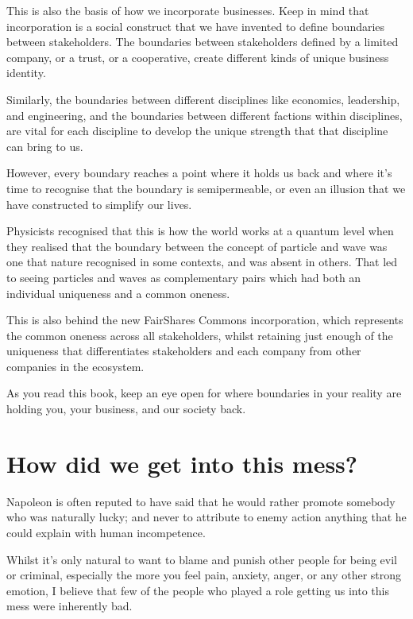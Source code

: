 This is also the basis of how we incorporate businesses. Keep in mind that incorporation is a social construct that we have invented to define boundaries between stakeholders. The boundaries between stakeholders defined by a limited company, or a trust, or a cooperative, create different kinds of unique business identity.


Similarly, the boundaries between different disciplines like economics, leadership, and engineering, and the boundaries between different factions within disciplines, are vital for each discipline to develop the unique strength that that discipline can bring to us.


However, every boundary reaches a point where it holds us back and where it's time to recognise that the boundary is semipermeable, or even an illusion that we have constructed to simplify our lives.


Physicists recognised that this is how the world works at a quantum level when they realised that the boundary between the concept of particle and wave was one that nature recognised in some contexts, and was absent in others. That led to seeing particles and waves as complementary pairs which had both an individual uniqueness and a common oneness.


This is also behind the new FairShares Commons incorporation, which represents the common oneness across all stakeholders, whilst retaining just enough of the uniqueness that differentiates stakeholders and each company from other companies in the ecosystem.


As you read this book, keep an eye open for where boundaries in your reality are holding you, your business, and our society back.






\section{How did we get into this mess?}
\label{section:into-mess}


Napoleon is often reputed to have said that he would rather promote somebody who was naturally lucky; and never to attribute to enemy action anything that he could explain with human incompetence.


Whilst it's only natural to want to blame and punish other people for being evil or criminal, especially the more you feel pain, anxiety, anger, or any other strong emotion, I believe that few of the people who played a role getting us into this mess were inherently bad.


